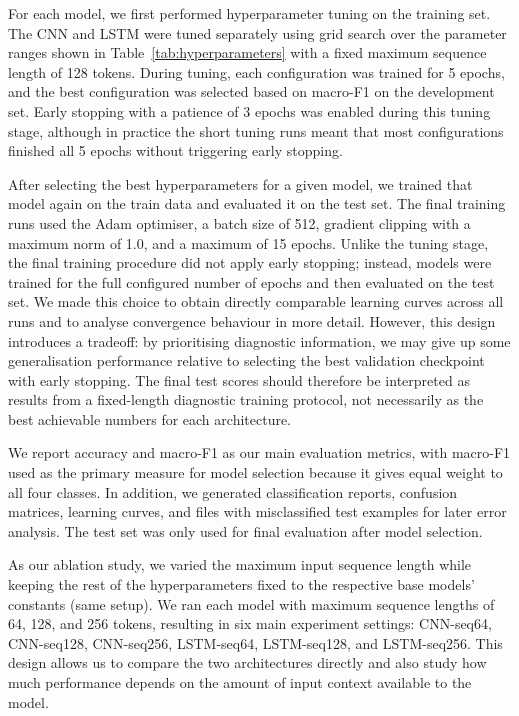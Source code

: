 For each model, we first performed hyperparameter tuning on the training set. The CNN and LSTM were tuned separately using grid search over the parameter ranges shown in Table~\ref{tab:hyperparameters} with a fixed maximum sequence length of 128 tokens. During tuning, each configuration was trained for 5 epochs, and the best configuration was selected based on macro-F1 on the development set. Early stopping with a patience of 3 epochs was enabled during this tuning stage, although in practice the short tuning runs meant that most configurations finished all 5 epochs without triggering early stopping.

After selecting the best hyperparameters for a given model, we trained that model again on the train data and evaluated it on the test set. The final training runs used the Adam optimiser, a batch size of 512, gradient clipping with a maximum norm of 1.0, and a maximum of 15 epochs. Unlike the tuning stage, the final training procedure did not apply early stopping; instead, models were trained for the full configured number of epochs and then evaluated on the test set. We made this choice to obtain directly comparable learning curves across all runs and to analyse convergence behaviour in more detail. However, this design introduces a tradeoff: by prioritising diagnostic information, we may give up some generalisation performance relative to selecting the best validation checkpoint with early stopping. The final test scores should therefore be interpreted as results from a fixed-length diagnostic training protocol, not necessarily as the best achievable numbers for each architecture.

We report accuracy and macro-F1 as our main evaluation metrics, with macro-F1 used as the primary measure for model selection because it gives equal weight to all four classes. In addition, we generated classification reports, confusion matrices, learning curves, and files with misclassified test examples for later error analysis. The test set was only used for final evaluation after model selection.

As our ablation study, we varied the maximum input sequence length while keeping the rest of the hyperparameters fixed to the respective base models' constants (same setup). We ran each model with maximum sequence lengths of 64, 128, and 256 tokens, resulting in six main experiment settings: CNN-seq64, CNN-seq128, CNN-seq256, LSTM-seq64, LSTM-seq128, and LSTM-seq256. This design allows us to compare the two architectures directly and also study how much performance depends on the amount of input context available to the model.
